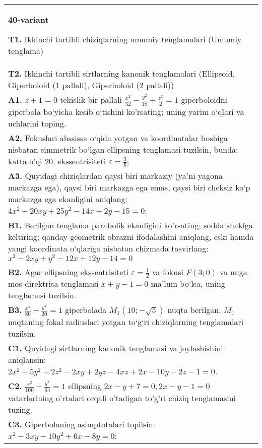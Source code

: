 \documentclass{article}
\begin{document}
\begin{tabular}{m{17cm}}
\textbf{40-variant}
\newline

\textbf{T1.} Ikkinchi tartibli chiziqlarning umumiy tenglamalari (Umumiy tenglama) \\
\textbf{T2.} Ikkinchi tartibli sirtlarning kanonik tenglamalari (Ellipsoid, Giperboloid (1 pallali), Giperboloid (2 pallali)) \\
\textbf{A1.} $z+1=0$ tekislik bir pallali $\frac{x^2}{32}-\frac{y^2}{18}+\frac{z^2}{2}=1$ giperboloidni giperbola bo‘yicha kesib o‘tishini ko'rsating; uning yarim o‘qlari va uchlarini toping. \\
\textbf{A2.} Fokuslari abssissa o‘qida yotgan va koordinatalar boshiga nisbatan simmetrik bo‘lgan ellipsning tenglamasi tuzilsin, bunda: katta o'qi 20, ekssentrisiteti $\varepsilon=\frac{3}{5}$; \\
\textbf{A3.} Quyidagi chiziqlardan qaysi biri markaziy (ya’ni yagona markazga ega), qaysi biri markazga ega emas, qaysi biri cheksiz ko‘p markazga ega ekanligini aniqlang: $4 x^2-20 x y+25 y^2-14 x+2 y-15=0$; \\
\textbf{B1.} Berilgan tenglama parabolik ekanligini ko'rsating; sodda shaklga keltiring; qanday geometrik obrazni ifodalashini aniqlang, eski hamda yangi koordinata o‘qlariga nisbatan chizmada tasvirlang: $x^2-2 x y+y^2-12 x+12 y-14=0$ \\
\textbf{B2.} Agar ellipsning ekssentrisiteti $\varepsilon=\frac{1}{2}$ va fokusi $F(3 ; 0)$ va unga mos direktrisa tenglamasi $x+y-1=0$ ma’lum bo‘lsa, uning tenglamasi tuzilsin. \\
\textbf{B3.} $\frac{x^2}{80}-\frac{y^2}{20}=1$ giperbolada $M_1 (10;-\sqrt{5}) $ nuqta berilgan. $M_1$ nuqtaning fokal radiuslari yotgan to‘g‘ri chiziqlarning tenglamalari tuzilsin. \\
\textbf{C1.} Quyidagi sirtlarning kanonik tenglamasi va joylashishini aniqlansin: $2 x^2+5 y^2+2 z^2-2 x y+2 y z-4 x z+2 x-10 y-2 z-1=0$. \\
\textbf{C2.} $\frac{x^2}{100}+\frac{y^2}{64}=1$ ellipsning $2 x-y+7=0,2 x-y-1=0$ vatarlarining o'rtalari orqali o'tadigan to'g'ri chiziq tenglamasini tuzing. \\
\textbf{C3.} Giperbolaning asimptotalari topilsin: $x^2-3 x y-10 y^2+6 x-8 y=0$; \\

\end{tabular}
\vspace{1cm}
\end{document}
